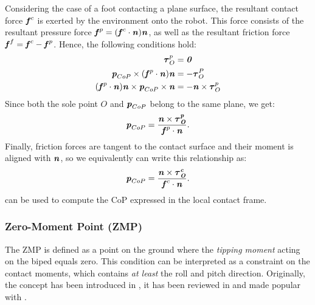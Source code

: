 Considering the case of a foot contacting a plane surface, the resultant contact force $\bm{\mathit{f}}^c$ is exerted by the environment onto the robot. This force consists of the resultant pressure force $\bm{\mathit{f}}^p=(\bm{\mathit{f}}^c\cdot\bm{\mathit{n}})\bm{\mathit{n}}$, as well as the resultant friction force $\bm{\mathit{f}}^f=\bm{\mathit{f}}^c-\bm{\mathit{f}}^p$.
Hence, the following conditions hold:
\begin{align*}
\bm{\mathit{\tau}}_O^p 		&= \bm{\mathit{0}} \\
\bm{\mathit{p}}_{CoP}\times(\bm{\mathit{f}}^p\cdot\bm{\mathit{n}})\bm{\mathit{n}}	&= -\bm{\mathit{\tau}}_O^P \\
(\bm{\mathit{f}}^p\cdot\bm{\mathit{n}})\bm{\mathit{n}}\times\bm{\mathit{p}}_{CoP}\times\bm{\mathit{n}}	&= -\bm{\mathit{n}}\times\bm{\mathit{\tau}}_O^p
\end{align*}
Since both the sole point $O$ and $\bm{\mathit{p}}_{CoP}$ belong to the same plane, we get:
\begin{equation*}
\bm{\mathit{p}}_{CoP}=\dfrac{\bm{\mathit{n}}\times\bm{\mathit{\bm{\mathit{\tau}}_O^p}}}{\bm{\mathit{f}}^p\cdot\bm{\mathit{n}}}.
\end{equation*}
Finally, friction forces are tangent to the contact surface and their moment is aligned with $\bm{\mathit{n}}$, so we equivalently can write this relationship as:
\begin{equation}\label{eqn:CoPComputation}
\bm{\mathit{p}}_{CoP}=\dfrac{\bm{\mathit{n}}\times\bm{\mathit{\bm{\mathit{\tau}}_O^c}}}{\bm{\mathit{f}}^c\cdot\bm{\mathit{n}}}.
\end{equation}
 can be used to compute the \gls{CoP} expressed in the local contact frame.

%
\subsubsection{Zero-Moment Point (ZMP)}
The \gls{ZMP} is defined as a point on the ground where the \textit{tipping moment} acting on the biped equals zero. This condition can be interpreted as a constraint on the contact moments, which contains \textit{at least} the roll and pitch direction. Originally, the concept has been introduced in \cite{vukobratovic1972stability}, it has been reviewed in \cite{vukobratovic2004zero} and made popular with \cite{kajita2003biped}.

